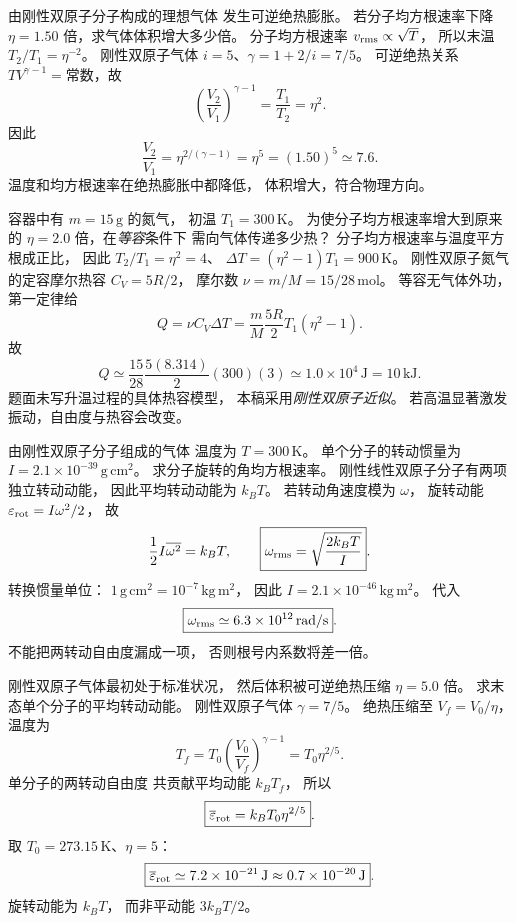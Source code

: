 由刚性双原子分子构成的理想气体
发生可逆绝热膨胀。
若分子均方根速率下降
$\eta=1.50$ 倍，求气体体积增大多少倍。
\exsolution
分子均方根速率
$v_{\rm rms}\propto\sqrt T$，
所以末温
$T_2/T_1=\eta^{-2}$。
刚性双原子气体
$i=5$、$\gamma=1+2/i=7/5$。
可逆绝热关系
$TV^{\gamma-1}=\text{常数}$，故
\[
\left(\frac{V_2}{V_1}\right)^{\gamma-1}
=\frac{T_1}{T_2}=\eta^2.
\]
因此
\[
\boxed{\frac{V_2}{V_1}
=\eta^{2/(\gamma-1)}
=\eta^5
=(1.50)^5\simeq7.6}.
\]
\excheck 温度和均方根速率在绝热膨胀中都降低，
体积增大，符合物理方向。

容器中有 $m=15\,\mathrm g$ 的氮气，
初温 $T_1=300\,\mathrm K$。
为使分子均方根速率增大到原来的
$\eta=2.0$ 倍，在\emph{等容}条件下
需向气体传递多少热？
\exsolution
分子均方根速率与温度平方根成正比，
因此
$T_2/T_1=\eta^2=4$、
$\Delta T=(\eta^2-1)T_1=900\,\mathrm K$。
刚性双原子氮气的定容摩尔热容
$C_V=5R/2$，
摩尔数
$\nu=m/M=15/28\,\mathrm{mol}$。
等容无气体外功，第一定律给
\[
Q=\nu C_V\Delta T
=\frac mM\frac{5R}{2}T_1(\eta^2-1).
\]
故
\[
\boxed{Q\simeq
\frac{15}{28}\frac{5(8.314)}{2}(300)(3)
\simeq1.0\times10^4\,\mathrm J=10\,\mathrm{kJ}}.
\]
\excheck 题面未写升温过程的具体热容模型，
本稿采用\emph{刚性双原子近似}。
若高温显著激发振动，自由度与热容会改变。

由刚性双原子分子组成的气体
温度为 $T=300\,\mathrm K$。
单个分子的转动惯量为
$I=2.1\times10^{-39}\,\mathrm{g\,cm^2}$。
求分子旋转的角均方根速率。
\exsolution
刚性线性双原子分子有两项独立转动动能，
因此平均转动动能为 $k_BT$。
若转动角速度模为 $\omega$，
旋转动能 $\varepsilon_{\rm rot}=I\omega^2/2$，
故
\[
\frac12I\overline{\omega^2}=k_BT,\qquad
\boxed{\omega_{\rm rms}=\sqrt{\frac{2k_BT}{I}}}.
\]
转换惯量单位：
$1\,\mathrm{g\,cm^2}=10^{-7}\,\mathrm{kg\,m^2}$，
因此
$I=2.1\times10^{-46}\,\mathrm{kg\,m^2}$。
代入
\[
\boxed{\omega_{\rm rms}\simeq
6.3\times10^{12}\,\mathrm{rad/s}}.
\]
\excheck 不能把两转动自由度漏成一项，
否则根号内系数将差一倍。

刚性双原子气体最初处于标准状况，
然后体积被可逆绝热压缩
$\eta=5.0$ 倍。
求末态单个分子的平均转动动能。
\exsolution
刚性双原子气体
$\gamma=7/5$。
绝热压缩至 $V_f=V_0/\eta$，
温度为
\[
T_f=T_0\left(\frac{V_0}{V_f}\right)^{\gamma-1}
=T_0\eta^{2/5}.
\]
单分子的两转动自由度
共贡献平均动能 $k_BT_f$，
所以
\[
\boxed{\overline\varepsilon_{\rm rot}
=k_BT_0\eta^{2/5}}.
\]
取 $T_0=273.15\,\mathrm K$、$\eta=5$：
\[
\boxed{\overline\varepsilon_{\rm rot}
\simeq7.2\times10^{-21}\,\mathrm J
\approx0.7\times10^{-20}\,\mathrm J}.
\]
\excheck 旋转动能为 $k_BT$，
而非平动能 $3k_BT/2$。

